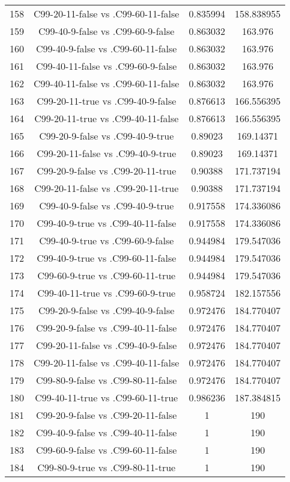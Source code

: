 \documentclass[a4paper,10pt]{article}
\begin{document}
\begin{landscape}
\begin{table}[!htp]
\begin{tabular}{cccc}
158&C99-20-11-false vs .C99-60-11-false&0.835994&158.838955\\
159&C99-40-9-false vs .C99-60-9-false&0.863032&163.976\\
160&C99-40-9-false vs .C99-60-11-false&0.863032&163.976\\
161&C99-40-11-false vs .C99-60-9-false&0.863032&163.976\\
162&C99-40-11-false vs .C99-60-11-false&0.863032&163.976\\
163&C99-20-11-true vs .C99-40-9-false&0.876613&166.556395\\
164&C99-20-11-true vs .C99-40-11-false&0.876613&166.556395\\
165&C99-20-9-false vs .C99-40-9-true&0.89023&169.14371\\
166&C99-20-11-false vs .C99-40-9-true&0.89023&169.14371\\
167&C99-20-9-false vs .C99-20-11-true&0.90388&171.737194\\
168&C99-20-11-false vs .C99-20-11-true&0.90388&171.737194\\
169&C99-40-9-false vs .C99-40-9-true&0.917558&174.336086\\
170&C99-40-9-true vs .C99-40-11-false&0.917558&174.336086\\
171&C99-40-9-true vs .C99-60-9-false&0.944984&179.547036\\
172&C99-40-9-true vs .C99-60-11-false&0.944984&179.547036\\
173&C99-60-9-true vs .C99-60-11-true&0.944984&179.547036\\
174&C99-40-11-true vs .C99-60-9-true&0.958724&182.157556\\
175&C99-20-9-false vs .C99-40-9-false&0.972476&184.770407\\
176&C99-20-9-false vs .C99-40-11-false&0.972476&184.770407\\
177&C99-20-11-false vs .C99-40-9-false&0.972476&184.770407\\
178&C99-20-11-false vs .C99-40-11-false&0.972476&184.770407\\
179&C99-80-9-false vs .C99-80-11-false&0.972476&184.770407\\
180&C99-40-11-true vs .C99-60-11-true&0.986236&187.384815\\
181&C99-20-9-false vs .C99-20-11-false&1&190\\
182&C99-40-9-false vs .C99-40-11-false&1&190\\
183&C99-60-9-false vs .C99-60-11-false&1&190\\
184&C99-80-9-true vs .C99-80-11-true&1&190\\

\end{tabular}
\end{table}
\end{landscape}
\end{document}
